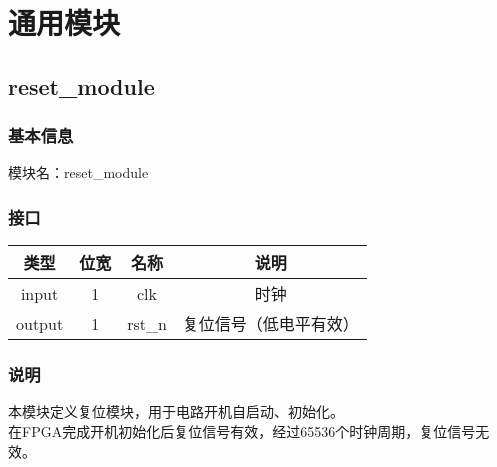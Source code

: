 %
% 
% 
% 
% 
% 
% 
%

\chapter{通用模块}

\section{reset\_module}
\subsection{基本信息}
模块名：reset\_module
\subsection{接口}
\begin{tabular}{|c|c|c|c|}
    \hline
    类型    &   位宽    &   名称    &   说明\\\hline
    input   &   1   &   clk &   时钟\\\hline
    output   &   1   &   rst\_n  &   复位信号（低电平有效）\\\hline
\end{tabular}
\subsection{说明}
本模块定义复位模块，用于电路开机自启动、初始化。\\
在FPGA完成开机初始化后复位信号有效，经过65536个时钟周期，复位信号无效。
